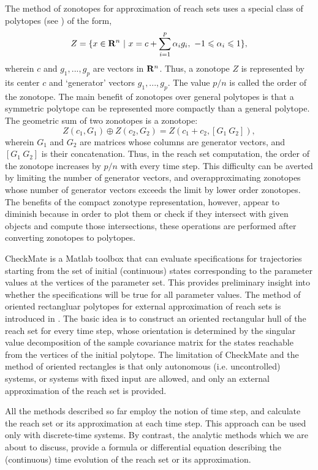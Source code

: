 The method of zonotopes for approximation of reach sets
\cite{girard, leguernic, matisse} uses a special class of polytopes
(see \cite{zonotool}) of the form,
\[ Z=\{x \in {\bf R}^n ~|~
x=c+\sum_{i=1}^p\alpha_ig_i,~ -1\leq\alpha_i\leq1\}, \]
wherein $c$ and $g_1, ..., g_p$ are vectors in ${\bf R}^n$. Thus, a
zonotope $Z$ is  represented by its center $c$ and `generator' vectors
$g_1, ..., g_p$. The value $p/n$ is called the order of the zonotope.
The main benefit of zonotopes over general polytopes is that a symmetric
polytope can be represented more compactly than a general polytope.
The geometric sum of two zonotopes is a zonotope:
\[ Z(c_1, G_1)\oplus Z(c_2, G_2) = Z(c_1+c_2, [G_1 ~ G_2]), \]
wherein $G_1$ and $G_2$ are matrices whose columns are generator vectors,
and $[G_1 ~ G_2]$ is their concatenation. Thus, in the reach set computation,
the order of the zonotope increases by $p/n$ with every time step.
This difficulty can be averted by limiting the number of generator vectors,
and overapproximating zonotopes whose number of generator vectors exceeds
the limit by lower order zonotopes.
The benefits of the compact zonotype representation, however, appear
to diminish because in order to plot them or check if they
intersect with given objects and compute those intersections,
these operations are performed after converting zonotopes to polytopes.

CheckMate \cite{checkmate} is a Matlab toolbox that can evaluate specifications
for trajectories starting from the set of initial (continuous) states
corresponding to the parameter values at the vertices of the parameter set.
This provides preliminary insight into whether the specifications will be true
for all parameter values.
The method of oriented rectangluar polytopes for external approximation
of reach sets is introduced in \cite{krogh}.
The basic idea is to construct an oriented
rectangular hull of the reach set for every time step, whose orientation is
determined by the singular value decomposition of the sample covariance matrix
for the states reachable from the vertices of the initial polytope.
The limitation of CheckMate and the method of oriented rectangles is
that only autonomous (i.e. uncontrolled) systems, or  systems with fixed
input are allowed, and only an external approximation of the reach set
is provided.

All the methods described so far employ the notion of time step,
and calculate the reach set or its approximation at each time step.
This approach can be used only with discrete-time systems.
By contrast, the analytic methods which we are about to discuss,
provide a formula or differential equation describing the (continuous)
time evolution of the reach set or its approximation.

